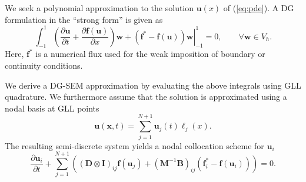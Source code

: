 \documentclass[preprint,10pt]{article}
\theoremstyle{definition}
\theoremstyle{lemma}
\theoremstyle{theorem}
\newcommand{\pd}[2]{\frac{\partial#1}{\partial#2}}
\newcommand{\LRp}[1]{\left( #1 \right)}
\begin{document}
We seek a polynomial approximation to the solution $\bm{u}(x)$ of (\ref{eq:pde}).  A DG formulation in the ``strong form'' \cite{hesthaven2007nodal} is given as
\[
\int_{-1}^1\LRp{ \pd{\bm{u}}{t} + \pd{\bm{f}(\bm{u})}{x}}\bm{w} + \left.\LRp{\bm{f}^* - \bm{f}(\bm{u})} \bm{w}\right|_{-1}^1 = 0, \qquad \forall \bm{w}\in V_h.
\]
Here, $\bm{f}^*$ is a numerical flux used for the weak imposition of boundary or continuity conditions.  

We derive a DG-SEM approximation by evaluating the above integrals using GLL quadrature.  We furthermore assume that the solution is approximated using a nodal basis at GLL points 
\[
\bm{u}(\bm{x},t) = \sum_{j=1}^{N+1} \bm{u}_j(t)\ell_j(x).  
\]
The resulting semi-discrete system yields a nodal collocation scheme for $\bm{u}_i$ 
\[
\pd{\bm{u}_i}{t} + \sum_{j=1}^{N+1}\LRp{\LRp{\bm{D}\otimes \bm{I}}_{ij}\bm{f}(\bm{u}_j) +\LRp{\bm{M}^{-1}\bm{B}}_{ij}(\bm{f}_i^* - \bm{f}(\bm{u}_i))} = 0.
\]
\end{document}
